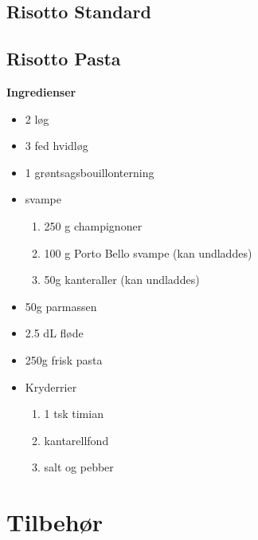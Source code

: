 \documentclass{book}
\begin{document}
{\section{Risotto Standard}
\begin{minipage}[t]{0.5\textwidth}
\end{minipage}
\begin{minipage}[t]{0.5\textwidth}
\end{minipage}
\section{Risotto Pasta}
\begin{minipage}[t]{0.5\textwidth}
\textbf{Ingredienser}
\begin{itemize}
    \item 2 løg
    \item 3 fed hvidløg
    \item 1 grøntsagsbouillonterning
    \item svampe
    \begin{enumerate}
        \item 250 g champignoner 
        \item 100 g Porto Bello svampe (kan undladdes)
        \item 50g kanteraller (kan undladdes)
    \end{enumerate}
    \item 50g parmassen
    \item 2.5 dL fløde
    \item 250g frisk pasta
    \item Kryderrier
    \begin{enumerate}
        \item 1 tsk timian
        \item kantarellfond
        \item salt og pebber
    \end{enumerate}
\end{itemize}
\end{minipage}
\begin{minipage}[t]{0.5\textwidth}
\end{minipage}
\chapter{Tilbehør}
}
\end{document}
